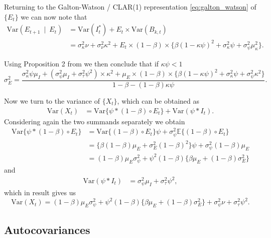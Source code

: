 \documentclass{article}
\begin{document}
Returning to the Galton-Watson / CLAR(1) representation \eqref{eq:galton_watson} of $\{E_t\}$ we can now note that
\begin{align*}
\text{Var}(E_{t + 1} \ \mid \ E_{t}) & = \text{Var}(I^*_t) + E_t \times \text{Var}(B_{k, t})\\
& = \sigma^2_\kappa \nu + \sigma^2_\nu\kappa^2 + E_t \times (1 - \beta) \times \{\beta (1 - \kappa\psi)^2 + \sigma^2_\kappa\psi + \sigma^2_\psi\mu_\kappa^2\}.
\end{align*}

Using Proposition 2 from \cite{Grunwald2000} we then conclude that if $\kappa \psi < 1$
$$
\sigma^2_E = \frac{\sigma^2_\kappa\psi \mu_I + (\sigma^2_\psi\mu_I + \sigma^2_\tau\psi^2)\times\kappa^2 + \mu_E \times (1 - \beta) \times \{\beta (1 - \kappa\psi)^2 + \sigma^2_\kappa\psi + \sigma^2_\psi\kappa^2\}}{1 - \beta - (1 - \beta)\kappa\psi}.
$$

Now we turn to the variance of $\{X_t\}$, which can be obtained as
\begin{align*}
\text{Var}(X_t) & = \text{Var}\{\psi * (1 - \beta) \circ E_t\} + \text{Var}(\psi * I_t).
\end{align*}
Considering again the two summands separately we obtain
\begin{align*}
\text{Var}\{\psi * (1 - \beta) \circ E_t\} & = \text{Var}\{(1 - \beta) \circ E_t\}\psi + \sigma^2_\psi\mathbb{E}\{(1 - \beta) \circ E_t\}\\
& = \{\beta(1 - \beta)\mu_E + \sigma^2_E(1 - \beta)^2\}\psi + \sigma^2_\psi(1- \beta)\mu_E\\
& = (1 - \beta)\mu_E \sigma^2_\psi + \psi^2(1 - \beta)\{\beta\mu_E + (1 - \beta)\sigma^2_E\}
\end{align*}
and
\begin{align*}
\text{Var}(\psi * I_t) & = \sigma^2_\psi\mu_I + \sigma^2_\tau\psi^2,
\end{align*}
which in result gives us
$$
\text{Var}(X_t) = (1 - \beta)\mu_E \sigma^2_\psi + \psi^2(1 - \beta)\{\beta\mu_E + (1 - \beta)\sigma^2_E\} + \sigma^2_\psi\nu + \sigma^2_\tau\psi^2.
$$

\subsection{Autocovariances}
\end{document}
